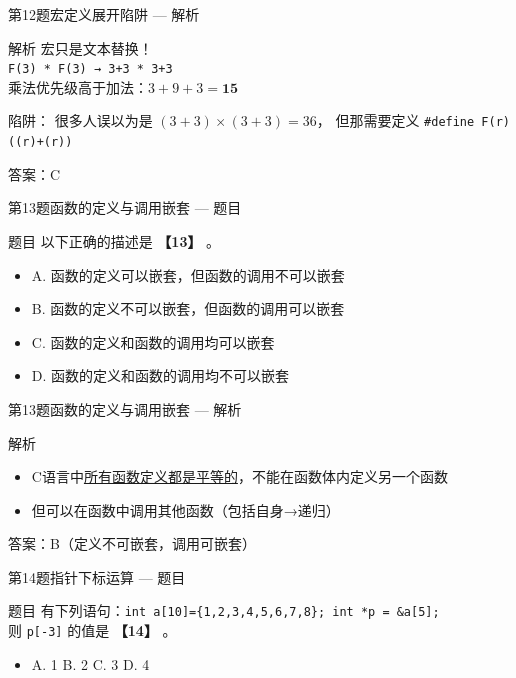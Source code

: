 \begin{frame}{第12题}{宏定义展开陷阱 --- 解析}
    \begin{alertblock}{解析}
        宏只是文本替换！\\
        \texttt{F(3) * F(3) → 3+3 * 3+3}\\
        乘法优先级高于加法：$3 + 9 + 3 = \textbf{15}$

        \vspace{0.5em}
        {\color{highlight}陷阱：} 很多人误以为是 $(3+3) \times (3+3) = 36$，
        但那需要定义 \texttt{\#define F(r) ((r)+(r))}

        \vspace{0.5em}
        {\color{highlight}答案：C}
    \end{alertblock}
\end{frame}

\begin{frame}{第13题}{函数的定义与调用嵌套 --- 题目}
    \begin{exampleblock}{题目}
        以下正确的描述是 \textbf{【13】} 。
        \begin{itemize}
            \item A. 函数的定义可以嵌套，但函数的调用不可以嵌套
            \item B. 函数的定义不可以嵌套，但函数的调用可以嵌套
            \item C. 函数的定义和函数的调用均可以嵌套
            \item D. 函数的定义和函数的调用均不可以嵌套
        \end{itemize}
    \end{exampleblock}
\end{frame}

\begin{frame}{第13题}{函数的定义与调用嵌套 --- 解析}
    \begin{alertblock}{解析}
        \footnotesize
        \begin{itemize}
            \setlength{\itemsep}{0pt}
            \item C语言中\underline{所有函数定义都是平等的}，不能在函数体内定义另一个函数
            \item 但可以在函数中调用其他函数（包括自身→递归）
        \end{itemize}
        {\color{highlight}答案：B（定义不可嵌套，调用可嵌套）}
    \end{alertblock}
\end{frame}

\begin{frame}{第14题}{指针下标运算 --- 题目}
    \begin{exampleblock}{题目}
        有下列语句：\texttt{int a[10]=\{1,2,3,4,5,6,7,8\}; int *p = \&a[5];}\\
        则 \texttt{p[-3]} 的值是 \textbf{【14】} 。
        \begin{itemize}
            \setlength{\itemsep}{0pt}
            \item A. 1 \quad B. 2 \quad C. 3 \quad D. 4
        \end{itemize}
    \end{exampleblock}
\end{frame}

